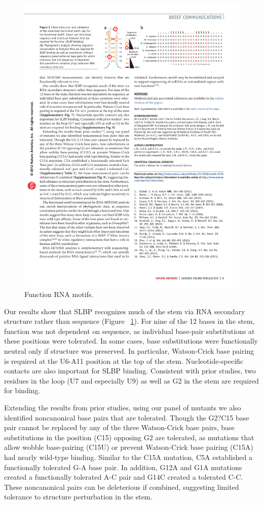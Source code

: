  \begin{figure}
\center\includegraphics[width=150mm,scale=0.5]{Figures/Fig30}
\caption{Function RNA motifs.}
\label{fig:Fig30}
\end{figure} 
 
Our results show that SLBP recognizes much of the stem via RNA secondary structure rather than sequence (Figure ~\ref{fig:Fig30}). For nine of the 12 bases in the stem, function was not dependent on sequence, as individual base-pair substitutions at these positions were tolerated. In some cases, base substitutions were functionally neutral only if structure was preserved. In particular, Watson-Crick base pairing is required at the U6-A11 position at the top of the stem. Nucleotide-specific contacts are also important for SLBP binding. Consistent with prior studies, two residues in the loop (U7 and especially U9) as well as G2 in the stem are required for binding.

Extending the results from prior studies, using our panel of mutants we also identified noncanonical base pairs that are tolerated. Though the G2?C15 base pair cannot be replaced by any of the three Watson-Crick base pairs, base substitutions in the position (C15) opposing G2 are tolerated, as mutations that allow wobble base-pairing (C15U) or prevent Watson-Crick base pairing (C15A) had nearly wild-type binding. Similar to the C15A mutation, C5A established a functionally tolerated G-A base pair. In addition, G12A and G1A mutations created a functionally tolerated A-C pair and G14C created a tolerated C-C. These noncanonical pairs can be deleterious if combined, suggesting limited tolerance to structure perturbation in the stem. 


